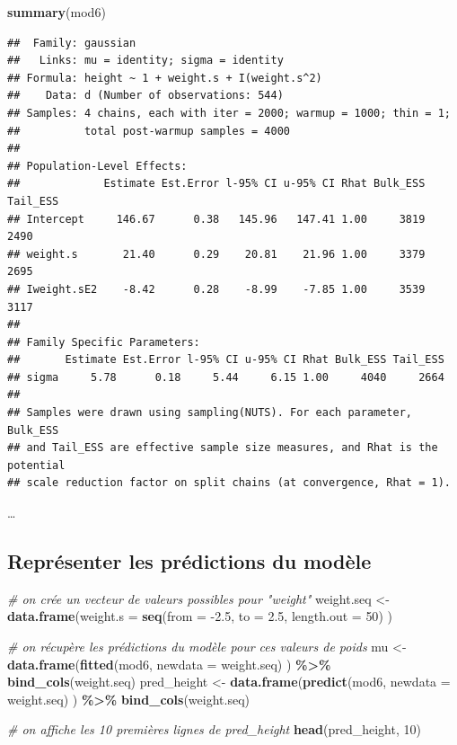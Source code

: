 \documentclass[
  a4paper,11pt,twoside,onecolumn,openright,final,oldfontcommands]{memoir}
\newenvironment{Shaded}{\begin{snugshade}}{\end{snugshade}}
\newcommand{\CommentTok}[1]{\textcolor[rgb]{0.56,0.35,0.01}{\textit{#1}}}
\newcommand{\DataTypeTok}[1]{\textcolor[rgb]{0.13,0.29,0.53}{#1}}
\newcommand{\DecValTok}[1]{\textcolor[rgb]{0.00,0.00,0.81}{#1}}
\newcommand{\FloatTok}[1]{\textcolor[rgb]{0.00,0.00,0.81}{#1}}
\newcommand{\KeywordTok}[1]{\textcolor[rgb]{0.13,0.29,0.53}{\textbf{#1}}}
\newcommand{\NormalTok}[1]{#1}
\newcommand{\OperatorTok}[1]{\textcolor[rgb]{0.81,0.36,0.00}{\textbf{#1}}}
\newcommand{\StringTok}[1]{\textcolor[rgb]{0.31,0.60,0.02}{#1}}
\theoremstyle{definition}
\theoremstyle{definition}
\theoremstyle{definition}
\theoremstyle{remark}
\begin{document}
\begin{Shaded}
\begin{Highlighting}[]
\KeywordTok{summary}\NormalTok{(mod6)}
\end{Highlighting}
\end{Shaded}

\begin{verbatim}
##  Family: gaussian 
##   Links: mu = identity; sigma = identity 
## Formula: height ~ 1 + weight.s + I(weight.s^2) 
##    Data: d (Number of observations: 544) 
## Samples: 4 chains, each with iter = 2000; warmup = 1000; thin = 1;
##          total post-warmup samples = 4000
## 
## Population-Level Effects: 
##             Estimate Est.Error l-95% CI u-95% CI Rhat Bulk_ESS Tail_ESS
## Intercept     146.67      0.38   145.96   147.41 1.00     3819     2490
## weight.s       21.40      0.29    20.81    21.96 1.00     3379     2695
## Iweight.sE2    -8.42      0.28    -8.99    -7.85 1.00     3539     3117
## 
## Family Specific Parameters: 
##       Estimate Est.Error l-95% CI u-95% CI Rhat Bulk_ESS Tail_ESS
## sigma     5.78      0.18     5.44     6.15 1.00     4040     2664
## 
## Samples were drawn using sampling(NUTS). For each parameter, Bulk_ESS
## and Tail_ESS are effective sample size measures, and Rhat is the potential
## scale reduction factor on split chains (at convergence, Rhat = 1).
\end{verbatim}

\ldots{}

\hypertarget{repruxe9senter-les-pruxe9dictions-du-moduxe8le-1}{%
\subsection{Représenter les prédictions du modèle}\label{repruxe9senter-les-pruxe9dictions-du-moduxe8le-1}}

\begin{Shaded}
\begin{Highlighting}[]
\CommentTok{\# on crée un vecteur de valeurs possibles pour "weight"}
\NormalTok{weight.seq \textless{}{-}}\StringTok{ }\KeywordTok{data.frame}\NormalTok{(}\DataTypeTok{weight.s =} \KeywordTok{seq}\NormalTok{(}\DataTypeTok{from =} \FloatTok{{-}2.5}\NormalTok{, }\DataTypeTok{to =} \FloatTok{2.5}\NormalTok{, }\DataTypeTok{length.out =} \DecValTok{50}\NormalTok{) )}

\CommentTok{\# on récupère les prédictions du modèle pour ces valeurs de poids}
\NormalTok{mu \textless{}{-}}\StringTok{ }\KeywordTok{data.frame}\NormalTok{(}\KeywordTok{fitted}\NormalTok{(mod6, }\DataTypeTok{newdata =}\NormalTok{ weight.seq) ) }\OperatorTok{\%\textgreater{}\%}\StringTok{ }\KeywordTok{bind\_cols}\NormalTok{(weight.seq)}
\NormalTok{pred\_height \textless{}{-}}\StringTok{ }\KeywordTok{data.frame}\NormalTok{(}\KeywordTok{predict}\NormalTok{(mod6, }\DataTypeTok{newdata =}\NormalTok{ weight.seq) ) }\OperatorTok{\%\textgreater{}\%}\StringTok{ }\KeywordTok{bind\_cols}\NormalTok{(weight.seq)}

\CommentTok{\# on affiche les 10 premières lignes de pred\_height}
\KeywordTok{head}\NormalTok{(pred\_height, }\DecValTok{10}\NormalTok{)}
\end{Highlighting}
\end{Shaded}
\end{document}
